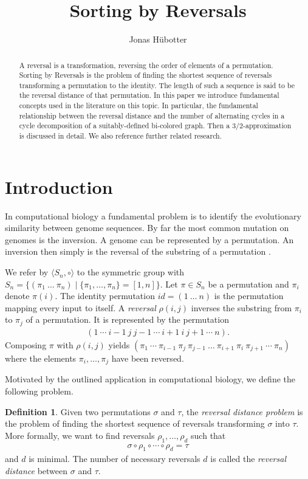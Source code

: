 \documentclass[11pt,DIV=11]{scrartcl}
\title{Sorting by Reversals}
\author{Jonas Hübotter}
\theoremstyle{definition}
\newtheorem{definition}[theorem]{Definition}
\theoremstyle{remark}
\begin{document}
\maketitle

\begin{abstract}
    A reversal is a transformation, reversing the order of elements of a permutation. Sorting by Reversals is the problem of finding the shortest sequence of reversals transforming a permutation to the identity. The length of such a sequence is said to be the reversal distance of that permutation. In this paper we introduce fundamental concepts used in the literature on this topic. In particular, the fundamental relationship between the reversal distance and the number of alternating cycles in a cycle decomposition of a suitably-defined bi-colored graph. Then a $3/2$-approximation is discussed in detail. We also reference further related research.
\end{abstract}

\section{Introduction}

In computational biology a fundamental problem is to identify the evolutionary similarity between genome sequences. By far the most common mutation on genomes is the inversion. A genome can be represented by a permutation. An inversion then simply is the reversal of the substring of a permutation \cite{Kececioglu1995}.

We refer by $\langle S_n, \circ \rangle$ to the symmetric group with $S_n = \{(\pi_1\ \dots\ \pi_n) \mid \{\pi_1, \dots, \pi_n\} = [1,n]\}$. Let $\pi \in S_n$ be a permutation and $\pi_i$ denote $\pi(i)$. The identity permutation $id = (1\ \dots\ n)$ is the permutation mapping every input to itself. A \textit{reversal} $\rho(i,j)$ inverses the substring from $\pi_i$ to $\pi_j$ of a permutation. It is represented by the permutation
\begin{align*}
    (1\ \cdots\ i-1\ j\ j-1\ \cdots\ i+1\ i\ j+1\ \cdots\ n).
\end{align*}
Composing $\pi$ with $\rho(i,j)$ yields $(\pi_1\ \cdots\ \pi_{i-1}\ \pi_j\ \pi_{j-1}\ \dots\ \pi_{i+1}\ \pi_i\ \pi_{j+1}\ \cdots\ \pi_n)$ where the elements $\pi_i, \dots, \pi_j$ have been reversed.

Motivated by the outlined application in computational biology, we define the following problem.

\begin{definition}
Given two permutations $\sigma$ and $\tau$, the \textit{reversal distance problem} is the problem of finding the shortest sequence of reversals transforming $\sigma$ into $\tau$. More formally, we want to find reversals $\rho_1, \dots, \rho_d$ such that
\begin{align*}
    \sigma \circ \rho_1 \circ \cdots \circ \rho_d = \tau
\end{align*}
and $d$ is minimal.
The number of necessary reversals $d$ is called the \textit{reversal distance} between $\sigma$ and $\tau$.
\end{definition}
\end{document}
